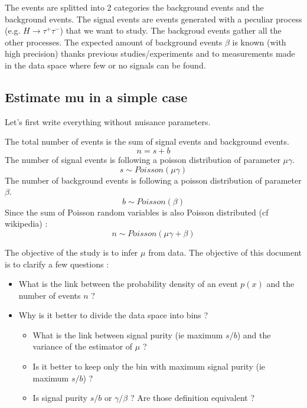The events are splitted into 2 categories the background events and the background events.
The signal events are events generated with a peculiar process (e.g. $H\to \tau^+ \tau^-$) that we want to study.
The backgroud events gather all the other processes.
The expected amount of background events $\beta$ is known (with high precision) thanks previous studies/experiments and to measurements made in the data space where few or no signals can be found.



\subsection{Estimate mu in a simple case} %
\label{sub:estimate_mu_in_a_simple_case}

Let's first write everything without nuisance parameters.

The total number of events is the sum of signal events and background events.
\begin{equation}
	n = s + b
\end{equation}
The number of signal events is following a poisson distribution of parameter $\mu \gamma$.
\begin{equation}
	s \sim Poisson(\mu \gamma)
\end{equation}
The number of background events is following a poisson distribution of parameter $\beta$.
\begin{equation}
	b \sim Poisson(\beta)
\end{equation}
Since the sum of Poisson random variables is also Poisson distributed \needcite (cf wikipedia) :
\begin{equation}
	n \sim Poisson(\mu \gamma + \beta)
\end{equation}

The objective of the study is to infer $\mu$ from data.
The objective of this document is to clarify a few questions :
\begin{itemize}
	\item What is the link between the probability density of an event $p(x)$ and the number of events $n$ ?
	\item Why is it better to divide the data space into bins ?
	\begin{itemize}
		\item What is the link between signal purity (ie maximum $s/b$) and the variance of the estimator of $\mu$ ?
		\item Is it better to keep only the bin with maximum signal purity (ie maximum $s/b$) ?
		\item Is signal purity $s/b$ or $\gamma / \beta$ ? Are those definition equivalent ?
	\end{itemize}
\end{itemize}



